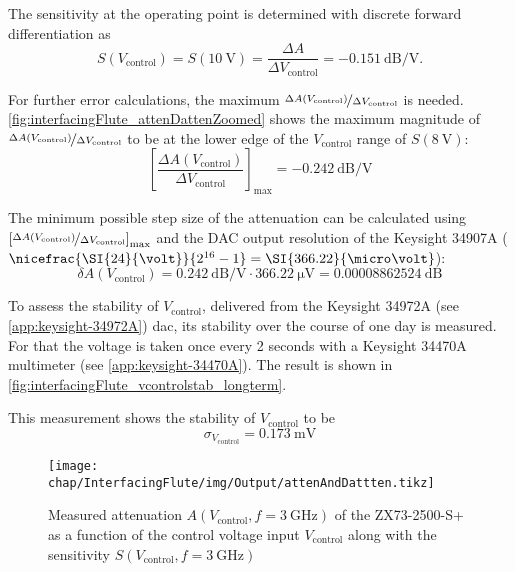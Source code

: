 The sensitivity at the operating point is determined with discrete forward differentiation as
\begin{equation}
S(V_\text{control})=S(\SI{10}{\volt})=\frac{\Delta A}{\Delta V_\text{control}} = \SI{-0.151}{\dB\per\volt}.
\end{equation}

For further error calculations, the maximum $\nicefrac{\Delta A(V_\text{control})}{\Delta V_\text{control}}$ is needed. \autoref{fig:interfacingFlute_attenDattenZoomed} shows the maximum magnitude of $\nicefrac{\Delta A(V_\text{control})}{\Delta V_\text{control}}$ to be at the lower edge of the $V_\text{control}$ range of $S(\SI{8}{\volt})$:
\begin{equation}
\left[\frac{\Delta A(V_\text{control})}{\Delta V_\text{control}}\right]_{\text{max}}=\SI{-0.242}{\dB\per\volt}
\end{equation}

The minimum possible step size of the attenuation can be calculated using $\left[\nicefrac{\Delta A(V_\text{control})}{\Delta V_\text{control}}\right]_{\text{max}}$ and the DAC output resolution of the Keysight 34907A ($\nicefrac{\SI{24}{\volt}}{2^{16}-1}=\SI{366.22}{\micro\volt}$):
\begin{equation}
\delta A(V_\text{control}) = \SI{0.242}{\dB\per\volt} \cdot \SI{366.22}{\micro\volt} = \SI{0.00008862524}{\dB}
\end{equation}

To assess the stability of $V_\text{control}$, delivered from the Keysight 34972A (see \autoref{app:keysight-34972A}) \gls{dac}, its stability over the course of one day is measured. For that the voltage is taken once every 2 seconds with a Keysight 34470A multimeter (see \autoref{app:keysight-34470A}). The result is shown in \autoref{fig:interfacingFlute_vcontrolstab_longterm}.

This measurement shows the stability of $V_\text{control}$ to be
\begin{equation}
\sigma_{V_\text{control}} = \SI{0.173}{\milli\volt}
\end{equation}

\begin{figure}[H]
	\centering
	\texttt{[image: chap/InterfacingFlute/img/Output/attenAndDattten.tikz]}
	\caption[Attenuation vs control voltage]{Measured attenuation $A(V_\text{control},f=\SI{3}{\GHz})$ of the ZX73-2500-S+ as a function of the control voltage input $V_\text{control}$ along with the sensitivity $S(V_\text{control},f=\SI{3}{\GHz})$}
	\label{fig:interfacingFlute_attenDatten}
\end{figure}

